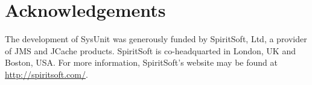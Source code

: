 \chapter{Acknowledgements}

The development of SysUnit was generously funded by
SpiritSoft, Ltd, a provider 
of JMS and JCache products.
SpiritSoft is co-headquarted in London, UK and Boston, USA.
For more information, SpiritSoft's website may be found
at \url{http://spiritsoft.com/}.
